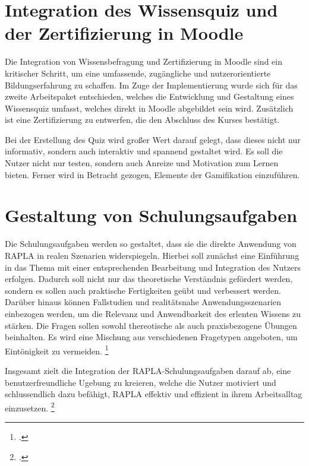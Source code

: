 \section{Integration des Wissensquiz und der Zertifizierung in Moodle}
Die Integration von Wissensbefragung und Zertifizierung in Moodle sind ein kritischer Schritt, um eine umfassende,
zugängliche und nutzerorientierte Bildungserfahrung zu schaffen. Im Zuge der Implementierung wurde sich
für das zweite Arbeitspaket entschieden, welches die Entwicklung und Gestaltung eines Wissensquiz umfasst, welches direkt in
Moodle abgebildet sein wird. Zusätzlich ist eine Zertifizierung zu entwerfen, die den Abschluss des Kurses bestätigt.

Bei der Erstellung des Quiz wird großer Wert darauf gelegt, dass dieses nicht nur informativ, sondern auch
interaktiv und spannend gestaltet wird. Es soll die Nutzer nicht nur testen, sondern auch
Anreize und Motivation zum Lernen bieten. Ferner wird in Betracht gezogen, Elemente der Gamifikation einzuführen.

\section{Gestaltung von Schulungsaufgaben}
Die Schulungsaufgaben werden so gestaltet, dass sie die direkte Anwendung von \ac{RAPLA} in realen Szenarien
widerspiegeln. Hierbei soll zunächst eine Einführung in das Thema mit einer entsprechenden Bearbeitung und Integration
des Nutzers erfolgen. Dadurch soll nicht nur das theoretische Verständnis gefördert werden, sondern es sollen auch praktische
Fertigkeiten geübt und verbessert werden. Darüber hinaus können Fallstudien und realitätsnahe Anwendungsszenarien einbezogen werden,
um die Relevanz und Anwendbarkeit des erlenten Wissens zu stärken.
Die Fragen sollen sowohl thereotische als auch praxisbezogene Übungen beinhalten.
Es wird eine Mischung aus verschiedenen Fragetypen angeboten, um Eintönigkeit zu vermeiden.
\footcite[Vgl.][141]{schweighoferDevelopmentQuizImplementation2019}

Insgesamt zielt die Integration der \ac{RAPLA}-Schulungsaufgaben darauf ab, eine benutzerfreundliche Ugebung zu kreieren,
welche die Nutzer motiviert und schlussendlich dazu befähigt, \ac{RAPLA} effektiv und effizient in ihrem Arbeitsalltag einzusetzen.
\footcite[Vgl.][1]{agambaExploringFacultyIntegration2012}

